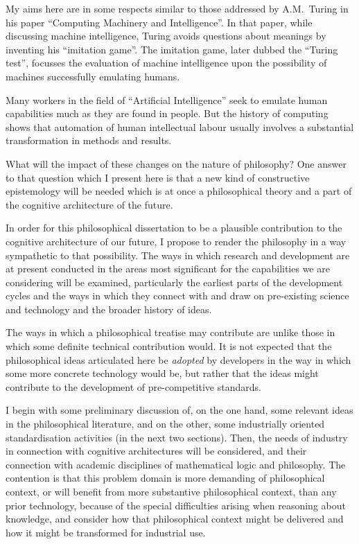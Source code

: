 My aims here are in some respects similar to those addressed by A.M.~Turing
in his paper ``Computing Machinery and Intelligence''.
In that paper, while discussing machine intelligence, Turing avoids questions
about meanings by inventing his ``imitation game''.
The imitation game, later dubbed the ``Turing test'', focusses the evaluation of
machine intelligence upon the possibility of machines successfully emulating humans.

Many workers in the field of ``Artificial Intelligence'' seek to emulate
human capabilities much as they are found in people.
But the history of computing shows that automation of human intellectual labour
usually involves a substantial transformation in methods and results.

What will the impact of these changes on the nature of philosophy?
One answer to that question which I present here is that a new kind of
constructive epistemology will be needed which is at once a philosophical
theory and a part of the cognitive architecture of the future.

In order for this philosophical dissertation to be a plausible contribution
to the cognitive architecture of our future, I propose to render the philosophy
in a way sympathetic to that possibility.
The ways in which research and development are at present conducted in the
areas most significant for the capabilities we are considering will be examined,
particularly the earliest parts of the development cycles and the ways in which
they connect with and draw on pre-existing science and technology and the
broader history of ideas.

The ways in which a philosophical treatise may contribute are unlike those in
which some definite technical contribution would.
It is not expected that the philosophical ideas articulated here be \emph{adopted} by developers
in the way in which some more concrete technology would be, but rather that
the ideas might contribute to the development of pre-competitive standards.

I begin with some preliminary discussion of, on the one hand, some relevant
ideas in the philosophical literature, and on the other, some industrially
oriented standardisation activities (in the next two sections).
Then, the needs of industry in connection with cognitive architectures will
be considered, and their connection with academic disciplines of mathematical
logic and philosophy.
The contention is that this problem domain is more demanding of philosophical
context, or will benefit from more substantive philosophical context, than any
prior technology, because of the special difficulties arising when reasoning
about knowledge, and consider how that philosophical context might be delivered
and how it might be transformed for industrial use.

